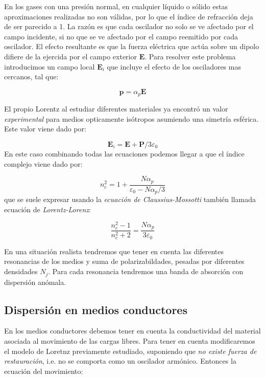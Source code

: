\documentclass[12pt,a4paper]{article}
\newcommand{\En}{\mathbf{E}}
\newcommand{\Pn}{\mathbf{P}}
\newcommand{\pn}{\mathbf{p}}
\numberwithin{equation}{section}
\numberwithin{figure}{section}
\begin{document}
En los gases con una presión normal, en cualquier líquido o sólido estas aproximaciones realizadas no son válidas, por lo que el índice de refracción deja de ser parecido a 1. La razón es que cada oscilador no solo se ve afectado por el campo incidente, si no que se ve afectado por el campo reemitido por cada oscilador. El efecto resultante es que la fuerza eléctrica que actúa sobre un dipolo difiere de la ejercida por el campo exterior $\En$. Para resolver este problema introducimos un campo local $\En_i$ que incluye el efecto de los osciladores mas cercanos, tal que:

\begin{equation}
\pn = \alpha_p \En
\end{equation}

El propio Lorentz al estudiar diferentes materiales ya encontró un valor \textit{experimental} para medios opticamente isótropos asumiendo una simetría esférica. Este valor viene dado por:

\begin{equation}
\En_i = \En + \Pn /3 \varepsilon_0
\end{equation}
En este caso combinando todas las ecuaciones podemos llegar a  que el índice complejo viene dado por:

\begin{equation}
n_c^2 = 1 + \dfrac{N \alpha_p}{\varepsilon_0 - N \alpha_p/3}
\end{equation}
que se suele expresar usando la \textit{ecuación de Claussius-Mossotti} también llamada ecuación de \textit{Lorentz-Lorenz}:

\begin{equation}
\dfrac{n_c^2 - 1}{n_c^2 + 2} = \dfrac{N \alpha_p}{3 \varepsilon_0}
\end{equation}

En una situación realista tendremos que tener en cuenta las diferentes resonancias de los medios y suma de polarizabildades, pesadas por diferentes densidades $N_j$. Para cada resonancia tendremos una banda de absorción con dispersión anómala.

\subsection{Dispersión en medios conductores}

En los medios conductores debemos tener en cuenta la conductividad del material asociada al movimiento de las cargas libres. Para tener en cuenta modificaremos el modelo de Loretnz previamente estudiado, suponiendo que \textit{no existe fuerza de restauración}, i.e. no se comporta como un oscilador armónico. Entonces la ecuación del movimiento:
\end{document}
